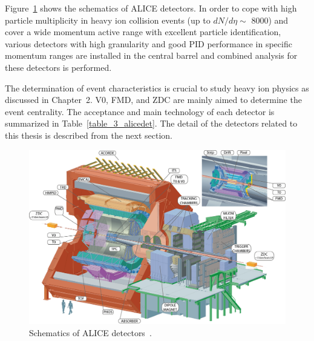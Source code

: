 Figure~\ref{fig_3_alicefigure} shows the schematics of ALICE detectors. 
In order to cope with high particle multiplicity in heavy ion collision events (up to $dN/d\eta \sim$ 8000) and cover a wide momentum active range with excellent particle identification, various detectors with high granularity and good PID performance in specific momentum ranges are installed in the central barrel and combined analysis for these detectors is performed. 

The determination of event characteristics is crucial to study heavy ion physics as discussed in Chapter~2.
V0, FMD, and ZDC are mainly aimed to determine the event centrality.  
The acceptance and main technology of each detector is summarized in Table~\ref{table_3_alicedet}. 
The detail of the detectors related to this thesis is described from the next section. 

\begin{figure}[!h]
  \centering
  \includegraphics[width=15cm]{chap3/figure/ALICE/ALICE_Schematics.jpg}
  \caption{Schematics of ALICE detectors~\cite{bib_aprrun1}.}
  \label{fig_3_alicefigure}
\end{figure}

